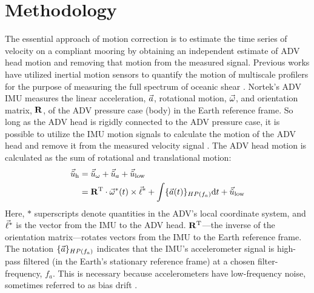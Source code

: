 
\section{Methodology}
\label{sec:methods}


\def\ue{\ensuremath{\vec{\tilde{u}}\earth}}



The essential approach of motion correction is to estimate the time series of velocity on a compliant mooring by obtaining an independent estimate of ADV head motion and removing that motion from the measured signal. Previous works have utilized inertial motion sensors to quantify the motion of multiscale profilers for the purpose of measuring the full spectrum of oceanic shear \cite[]{Winkel++1996}. Nortek's ADV IMU measures the linear acceleration, ${\vec{a}}$, rotational motion, $\vec{\omega}$, and orientation matrix, $\mathbf{R}$, of the ADV pressure case (body) in the Earth reference frame. So long as the ADV head is rigidly connected to the ADV pressure case, it is possible to utilize the IMU motion signals to calculate the motion of the ADV head and remove it from the measured velocity signal \cite[]{Miller++2008}. The ADV head motion is calculated as the sum of rotational and translational motion:
\begin{align}
  \label{eqn:uhead}
\begin{split}
  \uhead & = \urot + \uacc + \ulow \\
      & = \omatinv \cdot \AngRt^*(t)\times\l + \int \{\Accel(t)\}_{HP(f_{a})} \mathrm{d}t + \ulow
\end{split}
\end{align}
Here, $*$ superscripts denote quantities in the ADV's local coordinate system, and $\vec{\ell}^*$ is the vector from the IMU to the ADV head. $\mathbf{R}^\mathrm{T}$---the inverse of the orientation matrix---rotates vectors from the IMU to the Earth reference frame. The notation $\{{\vec{a}}\}_{HP(f_a)}$ indicates that the IMU's accelerometer signal is high-pass filtered (in the Earth's stationary reference frame) at a chosen filter-frequency, $f_a$. This is necessary because accelerometers have low-frequency noise, sometimes referred to as bias drift \cite[]{Barshan+Whyte1995, Bevly2004, Gulmammadov2009}.

